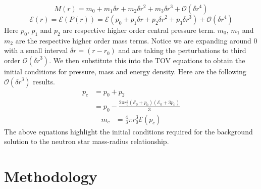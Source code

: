 \documentclass[aps,prd,twocolumn,superscriptaddress,footinbib]{revtex4-1}
\begin{document}
\begin{equation}
    M(r) = m_0 + m_1{\delta r} + m_2{\delta r}^2 + m_3{\delta r}^3 + \mathcal{O}({\delta r}^4)
\end{equation}
\begin{equation}
    \mathcal{E}(r) = \mathcal{E}(P(r)) = \mathcal{E}\left(p_0 + p_1{\delta r} + p_2{\delta r}^2 + p_3{\delta r}^3\right) + \mathcal{O}({\delta r}^4)
\end{equation}
Here $p_0$, $p_1$ and $p_2$ are respective higher order central pressure term. $m_0$, $m_1$ and $m_2$ are the respective higher order mass terms. Notice we are expanding around $0$ with a small interval ${\delta r} = (r-r_0)$ and are taking the perturbations to third order $\mathcal{O}({\delta r}^3)$. We then substitute this into the TOV equations to obtain the initial conditions for pressure, mass and energy density. Here are the following $\mathcal{O}({\delta r}^3)$ results. 
\begin{equation}
\begin{aligned}
    p_c &= p_0 + p_2 \\
    &= p_{0} - \frac{2 \pi r_{0}^{2} \left(\mathcal{E}_{0} + p_{0}\right) \left(\mathcal{E}_{0} + 3 p_{0}\right)}{3}
\end{aligned}
\end{equation}
\begin{equation}
\begin{aligned}
    m_c &= \frac{4}{3} \pi r_0^3 \mathcal{E}(p_c)
\end{aligned}
\end{equation}
The above equations highlight the initial conditions required for the background solution to the neutron star mass-radius relationship. 
\section{Methodology}
\end{document}
